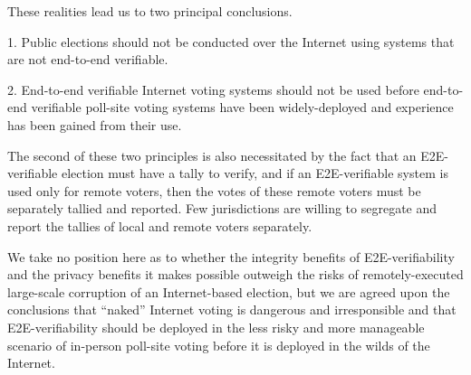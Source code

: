 These realities lead us to two principal conclusions.

1.	Public elections should not be conducted over the Internet
using systems that are not end-to-end verifiable.

2.	End-to-end verifiable Internet voting systems should not be
used before end-to-end verifiable poll-site voting systems have been
widely-deployed and experience has been gained from their use.

The second of these two principles is also necessitated by the fact
that an E2E-verifiable election must have a tally to verify, and if an
E2E-verifiable system is used only for remote voters, then the votes
of these remote voters must be separately tallied and reported.  Few
jurisdictions are willing to segregate and report the tallies of local
and remote voters separately. 

We take no position here as to whether the integrity benefits of
E2E-verifiability and the privacy benefits it makes possible outweigh
the risks of remotely-executed large-scale corruption of an
Internet-based election, but we are agreed upon the conclusions that
“naked” Internet voting is dangerous and irresponsible and that
E2E-verifiability should be deployed in the less risky and more
manageable scenario of in-person poll-site voting before it is
deployed in the wilds of the Internet.

